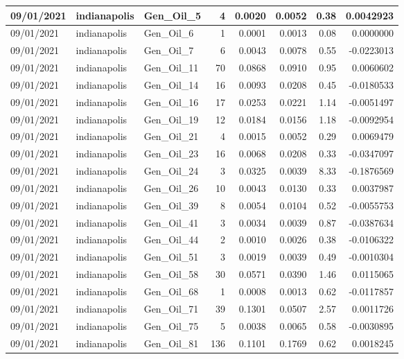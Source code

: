 \documentclass[
  letterpaper,
  DIV=11,
  numbers=noendperiod]{scrartcl}
\begin{document}
\begin{tabular}{l|l|l|r|r|r|r|r}
\hline
09/01/2021 & indianapolis & Gen\_Oil\_5 & 4 & 0.0020 & 0.0052 & 0.38 & 0.0042923\\
\hline
09/01/2021 & indianapolis & Gen\_Oil\_6 & 1 & 0.0001 & 0.0013 & 0.08 & 0.0000000\\
\hline
09/01/2021 & indianapolis & Gen\_Oil\_7 & 6 & 0.0043 & 0.0078 & 0.55 & -0.0223013\\
\hline
09/01/2021 & indianapolis & Gen\_Oil\_11 & 70 & 0.0868 & 0.0910 & 0.95 & 0.0060602\\
\hline
09/01/2021 & indianapolis & Gen\_Oil\_14 & 16 & 0.0093 & 0.0208 & 0.45 & -0.0180533\\
\hline
09/01/2021 & indianapolis & Gen\_Oil\_16 & 17 & 0.0253 & 0.0221 & 1.14 & -0.0051497\\
\hline
09/01/2021 & indianapolis & Gen\_Oil\_19 & 12 & 0.0184 & 0.0156 & 1.18 & -0.0092954\\
\hline
09/01/2021 & indianapolis & Gen\_Oil\_21 & 4 & 0.0015 & 0.0052 & 0.29 & 0.0069479\\
\hline
09/01/2021 & indianapolis & Gen\_Oil\_23 & 16 & 0.0068 & 0.0208 & 0.33 & -0.0347097\\
\hline
09/01/2021 & indianapolis & Gen\_Oil\_24 & 3 & 0.0325 & 0.0039 & 8.33 & -0.1876569\\
\hline
09/01/2021 & indianapolis & Gen\_Oil\_26 & 10 & 0.0043 & 0.0130 & 0.33 & 0.0037987\\
\hline
09/01/2021 & indianapolis & Gen\_Oil\_39 & 8 & 0.0054 & 0.0104 & 0.52 & -0.0055753\\
\hline
09/01/2021 & indianapolis & Gen\_Oil\_41 & 3 & 0.0034 & 0.0039 & 0.87 & -0.0387634\\
\hline
09/01/2021 & indianapolis & Gen\_Oil\_44 & 2 & 0.0010 & 0.0026 & 0.38 & -0.0106322\\
\hline
09/01/2021 & indianapolis & Gen\_Oil\_51 & 3 & 0.0019 & 0.0039 & 0.49 & -0.0010304\\
\hline
09/01/2021 & indianapolis & Gen\_Oil\_58 & 30 & 0.0571 & 0.0390 & 1.46 & 0.0115065\\
\hline
09/01/2021 & indianapolis & Gen\_Oil\_68 & 1 & 0.0008 & 0.0013 & 0.62 & -0.0117857\\
\hline
09/01/2021 & indianapolis & Gen\_Oil\_71 & 39 & 0.1301 & 0.0507 & 2.57 & 0.0011726\\
\hline
09/01/2021 & indianapolis & Gen\_Oil\_75 & 5 & 0.0038 & 0.0065 & 0.58 & -0.0030895\\
\hline
09/01/2021 & indianapolis & Gen\_Oil\_81 & 136 & 0.1101 & 0.1769 & 0.62 & 0.0018245\\

\end{tabular}
\end{document}
